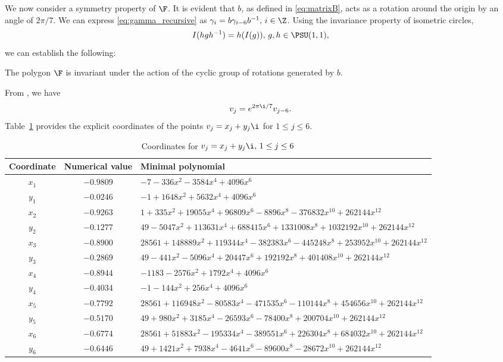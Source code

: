 We now consider a symmetry property of $\F$.
It is evident that $b$, as defined in \eqref{eq:matrixB}, acts as a rotation around the origin by an angle of $2\pi/7$.
We can express \eqref{eq:gamma_recursive} as $\gamma_{i} = b\gamma_{i-6}b^{-1}, \, i\in \Z$.
Using the invariance property of isometric circles,
\[
I(hgh^{-1}) = h(I(g)),\, g,h \in \PSU(1,1),
\]
we can establish the following:
\begin{prop} \label{prop:Fsym}
The polygon $\F$ is invariant under the action of the cyclic group of rotations generated by $b$.
\end{prop}

From , we have
\[
v_{j} = e^{2\pi \i /7}v_{j-6}.
\]
Table~\ref{tab:vcoor} provides the explicit coordinates of the points $v_j = x_j+  y_j\i$ for $1\leq j \leq 6$.

\begin{table}[ht]
\centering
\begin{tabular}{|c|c|p{10cm}|}
\hline
Coordinate & Numerical value & Minimal polynomial \\
\hline
$x_1$ & $-0.9809$ & $-7 - 336 x^2 - 3584 x^4 + 4096 x^6$ \\
\hline
$y_1$ & $-0.0246$ & $-1 + 1648 x^2 + 5632 x^4 + 4096 x^6$ \\
\hline
$x_2$ & $-0.9263$ & $1 + 335 x^2 + 19055 x^4 + 96809 x^6 - 8896 x^8 - 376832 x^{10} + 262144 x^{12}$ \\
\hline
$y_2$ & $-0.1277$ & $49 - 5047 x^2 + 113631 x^4 + 688415 x^6 + 1331008 x^8 + 1032192 x^{10} + 262144 x^{12}$ \\
\hline
$x_3$ & $-0.8900$ & $28561 + 148889 x^2 + 119344 x^4 - 382383 x^6 - 445248 x^8 + 253952 x^{10} + 262144 x^{12}$ \\
\hline
$y_3$ & $-0.2869$ & $49 - 441 x^2 - 5096 x^4 + 20447 x^6 + 192192 x^8 + 401408 x^{10} + 262144 x^{12}$ \\
\hline
$x_4$ & $-0.8944$ & $-1183 - 2576 x^2 + 1792 x^4 + 4096 x^6$ \\
\hline
$y_4$ & $-0.4034$ & $-1 - 144 x^2 + 256 x^4 + 4096 x^6$ \\
\hline
$x_5$ & $-0.7792$ & $28561 + 116948 x^2 - 80583 x^4 - 471535 x^6 - 110144 x^8 + 454656 x^{10} + 262144 x^{12}$ \\
\hline
$y_5$ & $-0.5170$ & $49 + 980 x^2 + 3185 x^4 - 26593 x^6 - 78400 x^8 + 200704 x^{10} + 262144 x^{12}$ \\
\hline
$x_6$ & $-0.6774$ & $28561 + 51883 x^2 - 195334 x^4 - 389551 x^6 + 226304 x^8 + 684032 x^{10} + 262144 x^{12}$ \\
\hline
$y_6$ & $-0.6446$ & $49 + 1421 x^2 + 7938 x^4 - 4641 x^6 - 89600 x^8 - 28672 x^{10} + 262144 x^{12}$ \\
\hline
\end{tabular}
\caption{Coordinates for $v_j = x_j+  y_j \i,\, 1 \leq j \leq 6$}
\label{tab:vcoor}
\end{table}

